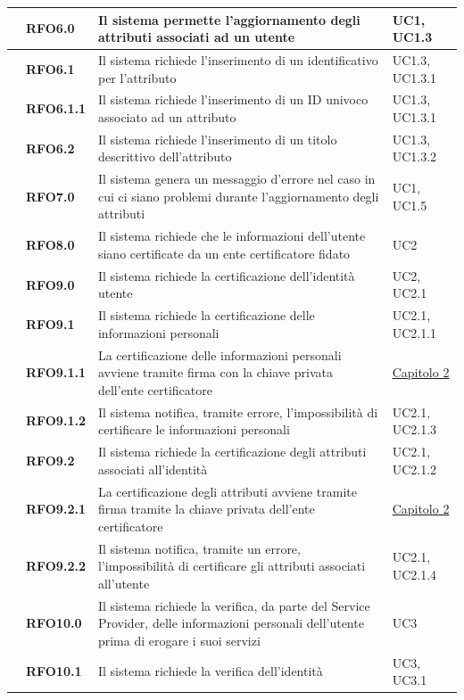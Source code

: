 \begin{longtable}{|r l|p{10cm}|p{2cm}|}
	&\textbf{RFO6.0}&Il sistema permette l'aggiornamento degli attributi associati ad un utente&UC1, UC1.3 \\\hline
	&\textbf{RFO6.1}&Il sistema richiede l'inserimento di un identificativo per l'attributo&UC1.3, UC1.3.1 \\\hline
	&\textbf{RFO6.1.1}&Il sistema richiede l'inserimento di un ID univoco associato ad un attributo&UC1.3, UC1.3.1 \\\hline
	&\textbf{RFO6.2}&Il sistema richiede l'inserimento di un titolo descrittivo dell'attributo &UC1.3, UC1.3.2 \\\hline
	&\textbf{RFO7.0}&Il sistema genera un messaggio d'errore nel caso in cui ci siano problemi durante l'aggiornamento degli attributi&UC1, UC1.5 \\\hline
	&\textbf{RFO8.0}&Il sistema richiede che le informazioni dell'utente siano certificate da un ente certificatore fidato&UC2 \\\hline
	&\textbf{RFO9.0}&Il sistema richiede la certificazione dell'identità utente&UC2, UC2.1 \\\hline
	&\textbf{RFO9.1}&Il sistema richiede la certificazione delle informazioni personali&UC2.1, UC2.1.1 \\\hline
	&\textbf{RFO9.1.1}&La certificazione delle informazioni personali avviene tramite firma con la chiave privata dell'ente certificatore&\hyperref[cap:tecnologie_e_strumenti]{Capitolo 2} \\\hline
	&\textbf{RFO9.1.2}&Il sistema notifica, tramite errore, l'impossibilità di certificare le informazioni personali &UC2.1, UC2.1.3 \\\hline
	&\textbf{RFO9.2}&Il sistema richiede la certificazione degli attributi associati all'identità &UC2.1, UC2.1.2 \\\hline
	&\textbf{RFO9.2.1}&La certificazione degli attributi avviene tramite firma tramite la chiave privata dell'ente certificatore &\hyperref[cap:tecnologie_e_strumenti]{Capitolo 2} \\\hline
	&\textbf{RFO9.2.2}&Il sistema notifica, tramite un errore, l'impossibilità di certificare gli attributi associati all'utente &UC2.1, UC2.1.4 \\\hline
	&\textbf{RFO10.0}&Il sistema richiede la verifica, da parte del Service Provider, delle informazioni personali dell'utente prima di erogare i suoi servizi &UC3 \\\hline
	&\textbf{RFO10.1}&Il sistema richiede la verifica dell'identità &UC3, UC3.1 \\\hline

\end{longtable}
